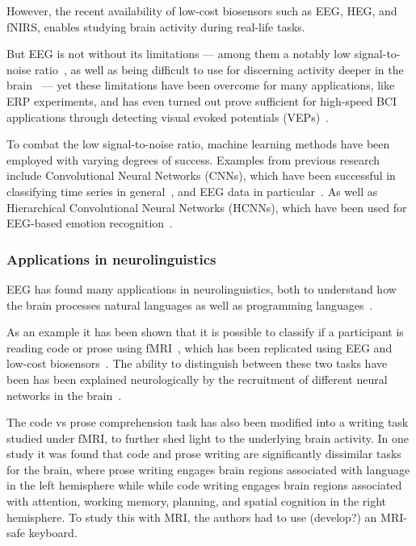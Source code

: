     However, the recent availability of low-cost biosensors such as EEG, HEG, and fNIRS, enables studying brain activity during real-life tasks.

    But EEG is not without its limitations --- among them a notably low signal-to-noise ratio~\cite{mcfarland_eeg-based_2017}, as well as being difficult to use for discerning activity deeper in the brain~\cite{fahimi_hnazaee_localization_2020} --- yet these limitations have been overcome for many applications, like ERP experiments, and has even turned out prove sufficient for high-speed BCI applications through detecting visual evoked potentials (VEPs)~\cite{spuler_high-speed_2017}.

    To combat the low signal-to-noise ratio, machine learning methods have been employed with varying degrees of success. Examples from previous research include Convolutional Neural Networks (CNNs), which have been successful in classifying time series in general~\cite{zhao_convolutional_2017}, and EEG data in particular~\cite{schirrmeister_deep_2017}. As well as Hierarchical Convolutional Neural Networks (HCNNs), which have been used for EEG-based emotion recognition~\cite{li_hierarchical_2018}.


    \subsubsection{Applications in neurolinguistics}

        EEG has found many applications in neurolinguistics, both to understand how the brain processes natural languages as well as programming languages~\cite{prat_relating_2020}.

         As an example it has been shown that it is possible to classify if a participant is reading code or prose using fMRI~\cite{floyd_decoding_2017}, which has been replicated using EEG and low-cost biosensors~\cite{fucci_replication_2019}. The ability to distinguish between these two tasks have been has been explained neurologically by the recruitment of different neural networks in the brain~\cite{ivanova_comprehension_2020}. 

        The code vs prose comprehension task has also been modified into a writing task studied under fMRI, to further shed light to the underlying brain activity. In one study it was found that code and prose writing are significantly dissimilar tasks for the brain, where prose writing engages brain regions associated with language in the left hemisphere while while code writing engages brain regions associated with attention, working memory, planning, and spatial cognition in the right hemisphere\cite{noauthor_neurological_nodate}. To study this with MRI, the authors had to use (develop?) an MRI-safe keyboard.


